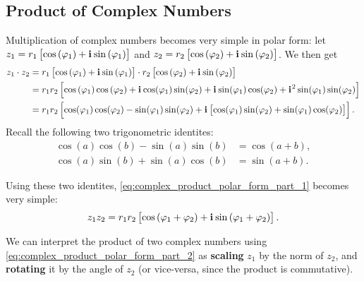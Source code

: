 \documentclass{article}
\newcommand{\iu}{\mathbf{i}\mkern1mu}
\newcommand{\zpolar}[2]{#1\left[\cos\left(#2\right)+\iu\sin\left(#2\right)\right]}
\begin{document}
\subsection{Product of Complex Numbers}
Multiplication of complex numbers becomes very simple in polar form: let $z_{1}=\zpolar{r_{1}}{\varphi_{1}}$ and $z_{2}=\zpolar{r_{2}}{\varphi_{2}}$. We then get
\begin{equation}
	\begin{aligned}
		z_{1}\cdot z_{2} & = \zpolar{r_{1}}{\varphi_{1}}\cdot\zpolar{r_{2}}{\varphi_{2}}                                                                                                                                                  \\
		                 & = r_{1}r_{2}\left[\cos\left(\varphi_{1}\right)\cos\left(\varphi_{2}\right) + \iu\cos(\varphi_{1})\sin(\varphi_{2}) + \iu\sin(\varphi_{1})\cos(\varphi_{2}) + \iu^{2}\sin(\varphi_{1})\sin(\varphi_{2}) \right] \\
		                 & = r_{1}r_{2}\left[\cos(\varphi_{1})\cos(\varphi_{2})-\sin(\varphi_{1})\sin(\varphi_{2}) + \iu\left[\cos(\varphi_{1})\sin(\varphi_{2})+\sin(\varphi_{1})\cos(\varphi_{2})\right]\right].
	\end{aligned}
	\label{eq:complex_product_polar_form_part_1}
\end{equation}
Recall the following two trigonometric identites:
\begin{equation}
	\begin{aligned}
		\cos(a)\cos(b)-\sin(a)\sin(b) & = \cos(a+b), \\
		\cos(a)\sin(b)+\sin(a)\cos(b) & = \sin(a+b).
	\end{aligned}
	\label{eq:trig_identites}
\end{equation}

Using these two identites, \autoref{eq:complex_product_polar_form_part_1} becomes very simple:
\begin{equation}
	z_{1}z_{2} = r_{1}r_{2}\zpolar{}{\varphi_{1}+\varphi_{2}}.
	\label{eq:complex_product_polar_form_part_2}
\end{equation}

We can interpret the product of two complex numbers using \autoref{eq:complex_product_polar_form_part_2} as \textbf{scaling} $z_{1}$ by the norm of $z_{2}$, and \textbf{rotating} it by the angle of $z_{2}$ (or vice-versa, since the product is commutative).
\end{document}
